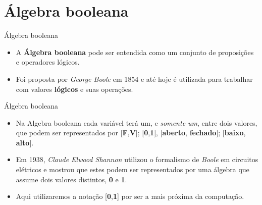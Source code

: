 



\section{Álgebra booleana}



\begin{frame}{Álgebra booleana} 

	\begin{itemize}
		\item A \textbf{Álgebra booleana} pode ser entendida como um conjunto de proposições e operadores lógicos.
	\end{itemize}

	\begin{itemize}
		\item Foi proposta por \textit{George Boole} em 1854 e até hoje é utilizada para trabalhar com valores \textbf{lógicos} e suas operações. 
	\end{itemize}

	
\end{frame}

\begin{frame}{Álgebra booleana} 

	\begin{itemize}
		\item Na Algebra booleana cada variável terá um, e \textit{somente um}, entre dois valores, que podem ser representados por [\textbf{F},\textbf{V}]; [\textbf{0},\textbf{1}], [\textbf{aberto}, \textbf{fechado}]; [\textbf{baixo}, \textbf{alto}].
	\end{itemize}

	\begin{itemize}
		\item Em 1938, \textit{Claude Elwood Shannon} utilizou o formalismo de \textit{Boole} em circuitos elétricos e mostrou que estes podem ser representados por uma álgebra que assume dois valores distintos, \textbf{0} e \textbf{1}.
	\end{itemize}

	\begin{itemize}
		\item Aqui utilizaremos a notação [\textbf{0},\textbf{1}] por ser a mais próxima da computação.
	\end{itemize}
\end{frame}




	
